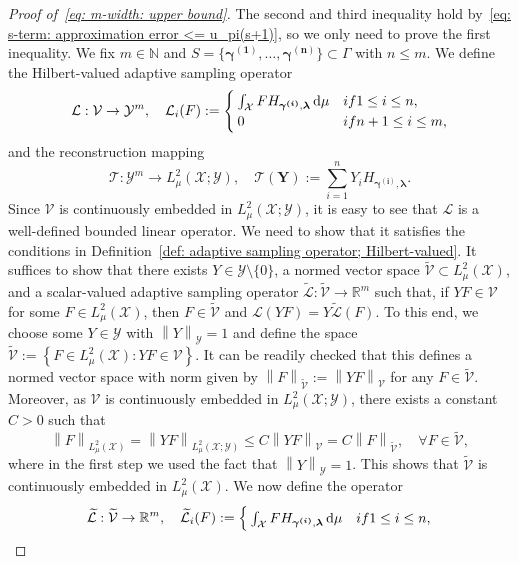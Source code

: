 \documentclass[namedate,webpdf]{ima-authoring-template-blank}
\def\D{\,\mathrm{d}}
\newcommand*{\nm}[1]{{\left\|#1\right \|}}
\numberwithin{counter}{section}
\numberwithin{equation}{section}
\theoremstyle{plain}
\theoremstyle{definition}
\newcommand*{\cL}{\mathcal{L}}
\newcommand*{\cT}{\mathcal{T}}
\newcommand*{\cV}{\mathcal{V}}
\newcommand*{\cX}{\mathcal{X}}
\newcommand*{\cY}{\mathcal{Y}}
\newcommand*{\bbN}{\mathbb{N}}
\newcommand*{\bbR}{\mathbb{R}}
\theoremstyle{thmstyletwo}
\begin{document}
\begin{proof}[Proof of~\eqref{eq: m-width: upper bound}]
    The second and third inequality hold by~\eqref{eq: s-term: approximation error <= u_pi(s+1)}, so we only need to prove the first inequality. 
    We fix \(m \in \bbN\) and \(S = \{\bm{\gamma}^{\bm{(1)}}, \dots, \bm{\gamma}^{\bm{(n)}}\} \subset \Gamma\) with \(n \leq m\). We define the Hilbert-valued adaptive sampling operator
    \[
    \cL: \cV \to \cY^m, \quad 
    \cL_i(F) := 
    \begin{cases}
        \int_{\cX} F H_{\bm{\gamma}^{\bm{(i)}}, \bm{\lambda}} \D \mu & \textup{if } 1 \leq i \leq n, \\
        0 & \textup{if } n + 1 \leq i \leq m,
    \end{cases}
    \]
    and the reconstruction mapping
    \[
    \cT: \cY^m \to L_{\mu}^2(\cX; \cY), \quad \cT(\bm{Y}) := \sum_{i=1}^n Y_i H_{\bm{\gamma}^{\bm{(i)}}, \bm{\lambda}}.
    \]
    Since \(\cV\) is continuously embedded in \(L_{\mu}^2(\cX; \cY)\), it is easy to see that \(\cL\) is a well-defined bounded linear operator. We need to show that it satisfies the conditions in Definition~\ref{def: adaptive sampling operator; Hilbert-valued}. It suffices to show that there exists \(Y \in \cY \setminus \{0\}\), a normed vector space \(\widetilde{\cV} \subset L_{\mu}^2(\cX)\), and a scalar-valued adaptive sampling operator \(\widetilde{\cL}: \widetilde{\cV} \to \bbR^m\) such that, if \(YF \in \cV\) for some \(F \in L_{\mu}^2(\cX)\), then \(F \in \widetilde{\cV}\) and \(\cL(Y F) = Y \widetilde{\cL}(F)\). 
    To this end, we choose some \(Y \in \cY\) with \(\nm{Y}_{\cY} = 1\) and define the space
    \(
    \widetilde{\cV} := \left\{F \in L_{\mu}^2(\cX): Y F \in \cV \right\}.
    \)
    It can be readily checked that this defines a normed vector space with norm given by \(\nm{F}_{\widetilde{\cV}} := \nm{Y F}_{\cV}\) for any \(F \in \widetilde{\cV}\). Moreover, as \(\cV\) is continuously embedded in \(L_{\mu}^2(\cX; \cY)\), there exists a constant \(C > 0\) such that
    \[
    \nm{F}_{L_{\mu}^2(\cX)} 
    = \nm{Y F}_{L_{\mu}^2(\cX; \cY)} 
    \leq C \nm{Y F}_{\cV} 
    = C \nm{F}_{\widetilde{\cV}}, \quad \forall F \in \widetilde{\cV},
    \]
    where in the first step we used the fact that \(\nm{Y}_{\cY} = 1\). This shows that \(\widetilde{\cV}\) is continuously embedded in \(L_{\mu}^2(\cX)\). We now define the operator
    \[
    \widetilde{\cL} : \widetilde{\cV} \to \bbR^m, \quad 
    \widetilde{\cL}_i(F) := 
    \begin{cases}
        \int_{\cX} F H_{\bm{\gamma}^{\bm{(i)}}, \bm{\lambda}} \D \mu & \textup{if } 1 \leq i \leq n, \\

\end{cases}\]
\end{proof}
\end{document}
